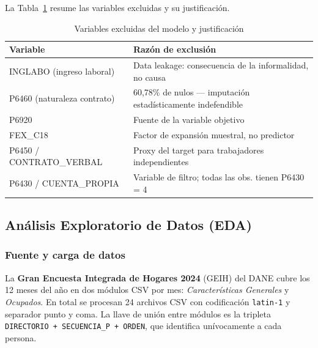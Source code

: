 \documentclass[12pt, a4paper]{article}
\begin{document}
La Tabla~\ref{tab:excluidas} resume las variables excluidas y su justificación.

\begin{table}[H]
\centering
\caption{Variables excluidas del modelo y justificación}
\label{tab:excluidas}
\begin{tabularx}{\textwidth}{lX}
\toprule
\textbf{Variable} & \textbf{Razón de exclusión} \\
\midrule
INGLABO (ingreso laboral) & Data leakage: consecuencia de la informalidad, no causa \\
P6460 (naturaleza contrato) & 60{,}78\% de nulos — imputación estadísticamente indefendible \\
P6920 & Fuente de la variable objetivo \\
FEX\_C18 & Factor de expansión muestral, no predictor \\
P6450 / CONTRATO\_VERBAL & Proxy del target para trabajadores independientes \\
P6430 / CUENTA\_PROPIA & Variable de filtro; todas las obs. tienen P6430 = 4 \\
\bottomrule
\end{tabularx}
\end{table}

\subsection{Análisis Exploratorio de Datos (EDA)}

\subsubsection{Fuente y carga de datos}

La \textbf{Gran Encuesta Integrada de Hogares 2024} (GEIH) del DANE cubre los 12 meses
del año en dos módulos CSV por mes: \textit{Características Generales} y \textit{Ocupados}.
En total se procesan 24 archivos CSV con codificación \texttt{latin-1} y separador punto
y coma. La llave de unión entre módulos es la tripleta
\texttt{DIRECTORIO + SECUENCIA\_P + ORDEN}, que identifica unívocamente a cada persona.
\end{document}
